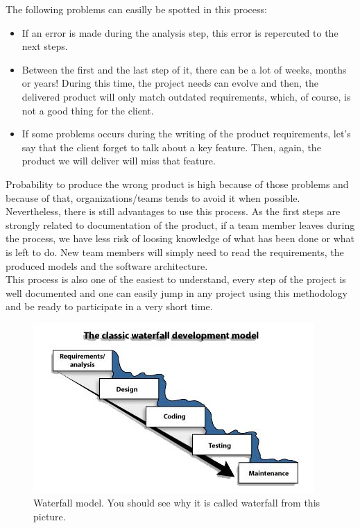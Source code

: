 \documentclass[12pt]{article}
\theoremstyle{definition}
\theoremstyle{definition}
\theoremstyle{remark}
\begin{document}
The following problems can easilly be spotted in this process:

\begin{itemize}

\item If an error is made during the analysis step, this error is repercuted to the next steps.
\item Between the first and the last step of it, there can be a lot of weeks, months or years! During this time, the project needs can evolve and then, the delivered product will only match outdated requirements, which, of course, is not a good thing for the client.
\item If some problems occurs during the writing of the product requirements, let's say that the client forget to talk about a key feature. Then, again, the product we will deliver will miss that feature.

\end{itemize}

Probability to produce the wrong product is high because of those problems and because of that, organizations/teams tends to avoid it when possible. Nevertheless, there is still advantages to use this process. As the first steps are strongly related to documentation of the product, if a team member leaves during the process, we have less risk of loosing knowledge of what has been done or what is left to do. New team members will simply need to read the requirements, the produced models and the software architecture.\\

This process is also one of the easiest to understand, every step of the project is well documented and one can easily jump in any project using this methodology and be ready to participate in a very short time.\\

\begin{figure}
    \centering
    \includegraphics[scale=0.8]{waterfall.jpg}
    \caption{Waterfall model. You should see why it is called waterfall from this picture.}
    \label{Waterfall}
\end{figure}
\end{document}

